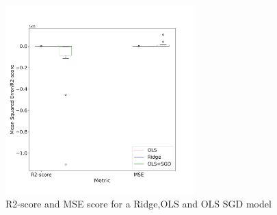 \documentclass[twocolumn]{cinc}
\begin{document}


\onecolumn
\appendix

\begin{figure}[htbp!]
\centering
\includegraphics[width=0.65\textwidth]{Figures/boxplot_OLS_ridge_sgd.png}
\caption{R2-score and MSE score for a Ridge,OLS and OLS SGD model}
\label{fig:appendix_sdg}
\end{figure}
\end{document}
